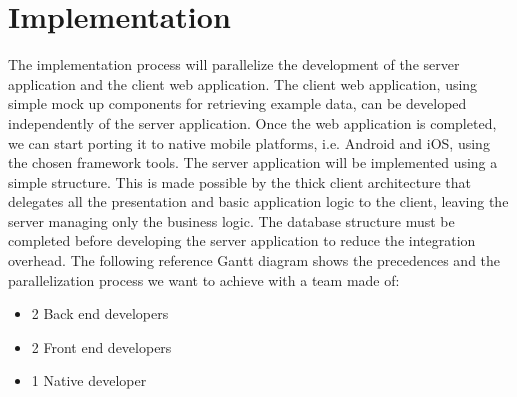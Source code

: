 \section{Implementation}

The implementation process will parallelize the development of the server application and the client web application.
The client web application, using simple mock up components for retrieving example data, can be developed independently
of the server application.
Once the web application is completed, we can start porting it to native mobile platforms, i.e. Android and iOS, using the
chosen framework tools.
The server application will be implemented using a simple structure. This is made possible by the thick client architecture
that delegates all the presentation and basic application logic to the client, leaving the server managing only the business logic.
\newline
\newline
The database structure must be completed before developing the server application to reduce the integration overhead.
\newline
\newline
The following reference Gantt diagram shows the precedences and the parallelization process we want to achieve with a team made of:
\begin{itemize}
  \item 2 Back end developers
  \item 2 Front end developers
  \item 1 Native developer
\end{itemize}


